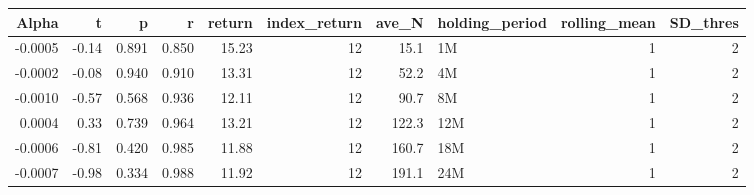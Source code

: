 \begin{table}[ht]
\centering
\begin{tabular}{rrrrrrrlrr}
  \hline
Alpha & t & p & r & return & index\_return & ave\_N & holding\_period & rolling\_mean & SD\_thres \\ 
  \hline
-0.0005 & -0.14 & 0.891 & 0.850 & 15.23 & 12 & 15.1 & 1M &  1 &  2 \\ 
  -0.0002 & -0.08 & 0.940 & 0.910 & 13.31 & 12 & 52.2 & 4M &  1 &  2 \\ 
  -0.0010 & -0.57 & 0.568 & 0.936 & 12.11 & 12 & 90.7 & 8M &  1 &  2 \\ 
  0.0004 & 0.33 & 0.739 & 0.964 & 13.21 & 12 & 122.3 & 12M &  1 &  2 \\ 
  -0.0006 & -0.81 & 0.420 & 0.985 & 11.88 & 12 & 160.7 & 18M &  1 &  2 \\ 
  -0.0007 & -0.98 & 0.334 & 0.988 & 11.92 & 12 & 191.1 & 24M &  1 &  2 \\ 
   \hline
\end{tabular}
\end{table}

